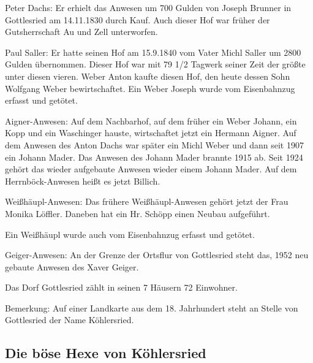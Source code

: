 \documentclass[12pt,a4pager]{book}
\begin{document}
Peter Dachs: Er erhielt das Anwesen um 700 Gulden von Joseph Brunner in
Gottlesried am 14.11.1830 durch Kauf. Auch dieser Hof war früher der
Gutsherrschaft Au und Zell unterworfen.

Paul Saller: Er hatte seinen Hof am 15.9.1840 vom Vater Michl Saller um 2800
Gulden übernommen. Dieser Hof war mit 79 1/2 Tagwerk seiner Zeit der größte unter
diesen vieren. Weber Anton kaufte diesen Hof, den heute dessen Sohn Wolfgang
Weber bewirtschaftet. Ein Weber Joseph wurde vom Eisenbahnzug erfasst und
getötet.

Aigner-Anwesen: Auf dem Nachbarhof, auf dem früher ein Weber Johann, ein Kopp
und ein Waschinger hauste, wirtschaftet jetzt ein Hermann Aigner. Auf dem
Anwesen des Anton Dachs war später ein Michl Weber und dann seit 1907 ein Johann
Mader. Das Anwesen des Johann Mader brannte 1915 ab. Seit 1924 gehört das wieder
aufgebaute Anwesen wieder einem Johann Mader. Auf dem Herrnböck-Anwesen heißt es
jetzt Billich.

Weißhäupl-Anwesen: Das frühere Weißhäupl-Anwesen gehört jetzt der Frau Monika
Löffler. Daneben hat ein Hr. Schöpp einen Neubau aufgeführt.

Ein Weißhäupl wurde auch vom Eisenbahnzug erfasst und getötet.

Geiger-Anwesen: An der Grenze der Ortsflur von Gottlesried steht das, 1952 neu
gebaute Anwesen des Xaver Geiger.

Das Dorf Gottlesried zählt in seinen 7 Häusern 72 Einwohner.

Bemerkung: Auf einer Landkarte aus dem 18. Jahrhundert steht an Stelle von
Gottlesried der Name Köhlersried.

\subsection{Die böse Hexe von Köhlersried}
\end{document}
